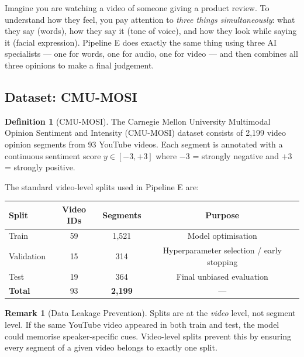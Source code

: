 \documentclass[12pt,a4paper]{article}
\theoremstyle{definition}
\newtheorem{definition}[theorem]{Definition}
\newtheorem{remark}[theorem]{Remark}
\begin{document}
\begin{laymanbox}
Imagine you are watching a video of someone giving a product review. To understand how they feel, you pay attention to \emph{three things simultaneously}: what they say (words), how they say it (tone of voice), and how they look while saying it (facial expression). Pipeline E does exactly the same thing using three AI specialists — one for words, one for audio, one for video — and then combines all three opinions to make a final judgement.
\end{laymanbox}

\subsection{Dataset: CMU-MOSI}

\begin{definition}[CMU-MOSI]
The Carnegie Mellon University Multimodal Opinion Sentiment and Intensity (CMU-MOSI) dataset consists of 2,199 video opinion segments from 93 YouTube videos. Each segment is annotated with a continuous sentiment score $y \in [-3, +3]$ where $-3$ = strongly negative and $+3$ = strongly positive.
\end{definition}

The standard video-level splits used in Pipeline E are:
\begin{center}
\begin{tabular}{lccc}
\toprule
\textbf{Split} & \textbf{Video IDs} & \textbf{Segments} & \textbf{Purpose} \\
\midrule
Train & 59 & 1,521 & Model optimisation \\
Validation & 15 & 314 & Hyperparameter selection / early stopping \\
Test & 19 & 364 & Final unbiased evaluation \\
\midrule
\textbf{Total} & 93 & \textbf{2,199} & — \\
\bottomrule
\end{tabular}
\end{center}

\begin{remark}[Data Leakage Prevention]
Splits are at the \emph{video} level, not segment level. If the same YouTube video appeared in both train and test, the model could memorise speaker-specific cues. Video-level splits prevent this by ensuring every segment of a given video belongs to exactly one split.
\end{remark}

\end{document}
